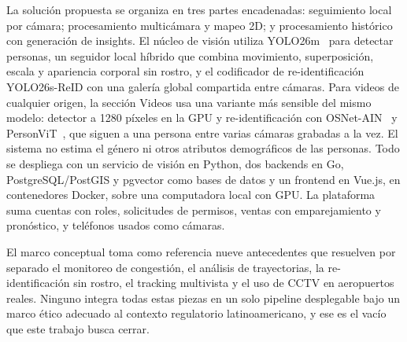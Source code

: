 \documentclass[12pt,a4paper]{article}
\begin{document}
La solución propuesta se organiza en tres partes encadenadas: seguimiento
local por cámara; procesamiento multicámara y mapeo 2D; y procesamiento
histórico con generación de insights. El núcleo de visión utiliza
YOLO26m~\cite{yolo26} para detectar personas, un seguidor local híbrido que combina
movimiento, superposición, escala y apariencia corporal sin rostro, y el
codificador de re-identificación YOLO26s-ReID con una galería global
compartida entre cámaras. Para videos de cualquier origen, la sección
Videos usa una variante más sensible del mismo modelo: detector a 1280
píxeles en la GPU y re-identificación con OSNet-AIN~\cite{zhou2022osnet} y PersonViT~\cite{hu2024personvit}, que
siguen a una persona entre varias cámaras grabadas a la vez. El sistema no estima el género ni otros atributos demográficos de las personas. Todo se despliega con un
servicio de visión en Python, dos backends en Go, PostgreSQL/PostGIS y
pgvector como bases de datos y un frontend en Vue.js, en contenedores
Docker, sobre una computadora local con GPU. La plataforma suma cuentas
con roles, solicitudes de permisos, ventas con emparejamiento y
pronóstico, y teléfonos usados como cámaras.

El marco conceptual toma como referencia nueve antecedentes que resuelven
por separado el monitoreo de congestión, el análisis de trayectorias, la
re-identificación sin rostro, el tracking multivista y el uso de CCTV en
aeropuertos reales. Ninguno integra todas estas piezas en un solo pipeline
desplegable bajo un marco ético adecuado al contexto regulatorio
latinoamericano, y ese es el vacío que este trabajo busca cerrar.
\end{document}
